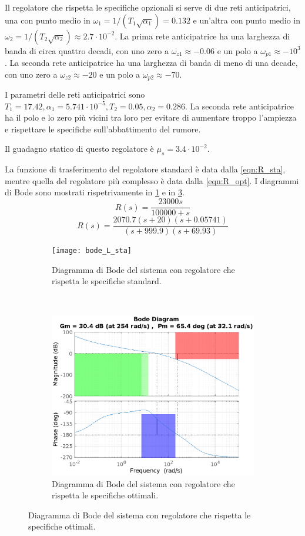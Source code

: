 \documentclass[a4paper]{article}
\begin{document}
Il regolatore che rispetta le specifiche opzionali si serve di due reti anticipatrici, una con punto medio in $\omega_1 = 1/ (T_1 \sqrt{\alpha_1}) = 0.132$ e un'altra con punto medio in $\omega_2 = 1/ (T_2 \sqrt{\alpha_2}) \approx 2.7 \cdot 10^{-2}$.
La prima rete anticipatrice ha una larghezza di banda di circa quattro decadi, con uno zero a $\omega_{z1} \approx -0.06$ e un polo a $\omega_{p1} \approx -10^3$. 
La seconda rete anticipatrice ha una larghezza di banda di meno di una decade, con uno zero a $\omega_{z2} \approx -20$ e un polo a $\omega_{p2} \approx -70$.

I parametri delle reti anticipatrici sono $T_1 = 17.42, \alpha_1 = 5.741 \cdot 10^{-5}, T_2 = 0.05, \alpha_2 = 0.286$.
La seconda rete anticipatrice ha il polo e lo zero più vicini tra loro per evitare di aumentare troppo l'ampiezza e rispettare le specifiche sull'abbattimento del rumore.

Il guadagno statico di questo regolatore è $\mu_s = 3.4 \cdot 10^{-2}$.

La funzione di trasferimento del regolatore standard è data dalla \cref{eqn:R_sta}, mentre quella del regolatore più complesso è data dalla \cref{eqn:R_opt}.
I diagrammi di Bode sono mostrati rispetrivamente in \cref{fig:bode_L_sta} e in \cref{fig:bode_L}.
\begin{equation}
    \label{eqn:R_sta}
    R(s) = \frac{23000 s}{100000 + s}
\end{equation}
\begin{equation}
    \label{eqn:R_opt}
    R(s) = \frac{2070.7 (s+20) (s+0.05741)}{(s+999.9) (s+69.93)}
\end{equation}
\begin{figure}[h]
\begin{subfigure}{0.49\textwidth}
    \centering
    \texttt{[image: bode\_L\_sta]}
    \caption{Diagramma di Bode del sistema con regolatore che rispetta le specifiche standard.}
    \label{fig:bode_L_sta}
\end{subfigure}
~
\begin{subfigure}{0.49\textwidth}
    \centering
    \includegraphics[width=\textwidth]{bode_L}
    \caption{Diagramma di Bode del sistema con regolatore che rispetta le specifiche ottimali.}
    \label{fig:bode_L}
\end{subfigure}
\end{figure}
\end{document}
